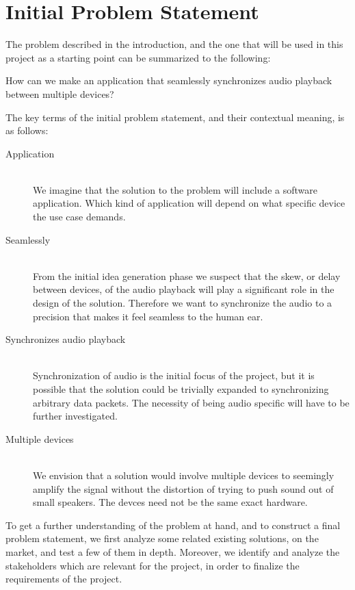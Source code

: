 \section{Initial Problem Statement}\label{sec:initial_problem}

The problem described in the introduction, and the one that will be used
in this project as a starting point can be summarized to the following:

\begin{problemstatement}
	How can we make an application that seamlessly synchronizes audio
	playback between multiple devices?
\end{problemstatement}

The key terms of the initial problem statement, and their contextual meaning,
is as follows:
\begin{description}
	\item[Application] \hfill \\
		We imagine that the solution to the problem will include a software
		application. Which kind of application will depend on what specific
		device the use case demands.
	\item[Seamlessly]  \hfill \\
		From the initial idea generation phase we suspect
		that the skew, or delay between devices, of the audio playback will
		play a significant role in the design of the solution. Therefore we
		want to synchronize the audio to a precision that makes it feel
		seamless to the human ear.
	\item[Synchronizes audio playback]  \hfill \\
		Synchronization of audio is the initial
		focus of the project, but it is possible that the solution could be
		trivially expanded to synchronizing arbitrary data packets. The
		necessity of being audio specific will have to be further investigated.
	\item[Multiple devices]  \hfill \\
		We envision that a solution would involve multiple devices to seemingly 
		amplify the signal without the distortion of trying to push sound out of
		small speakers. The devces need not be the same exact hardware.
\end{description}

To get a further understanding of the problem at hand, and to
construct a final problem statement, we first analyze some related
existing solutions, on the market, and test a few of them in depth. 
Moreover, we identify and analyze the stakeholders which are relevant for the project,
in order to finalize the requirements of the project.
